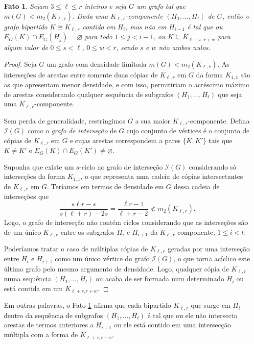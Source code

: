 \documentclass[12pt,a4paper]{book}
\newcommand{\K}{K_{\ell,r}} %
\newtheorem{fato}      [teorema] {Fato}
\begin{document}
      \begin{fato}\label{fato:ciclos}
        Sejam $3\leq \ell \leq r$ inteiros e seja $G$ um grafo tal que $m(G) < m_2(\K)$.  
        Dada uma $\K$-componente $(H_1, \ldots, H_t)$ de $G$, 
        então o grafo bipartido $K \cong \K$ contido em $H_i$, mas não em $H_{i-1}$ é tal que ou $E_G(K) \cap E_G(H_j) = \varnothing$
        para todo $1 \leq j < i-1$, ou  $K \subseteq K_{\ell+s, r+w}$
        para algum valor de $0\leq s < \ell$, $0\leq w < r$, sendo $s$ e $w$ não ambos nulos. 
  \end{fato}
\begin{proof}
        Seja $G$ um grafo com densidade limitada $m(G) < m_2(\K)$. 
        As interseções de arestas entre somente duas cópias de $\K$ em $G$ da forma $K_{1,1}$ são as que apresentam menor densidade, e com isso, permitiriam o acréscimo máximo de arestas considerando qualquer sequência de subgrafos $(H_1, \ldots, H_t)$ que seja uma $\K$-componente. 
        
        Sem perda de generalidade, restringimos $G$ a sua maior $\K$-componente.       
        Defina $\mathcal{I}(G)$ como o \emph{grafo de interseção} de $G$ cujo conjunto de vértices é o conjunto de cópias de $\K$ em $G$ e cujas arestas correspondem a pares $\{K, K'\}$ tais que $K \neq K'$ e $E_G(K) \cap E_G(K') \neq \varnothing$.
         
        Suponha que existe um $s$-ciclo no grafo de interseção $\mathcal{I}(G)$ considerando só interseções da forma $K_{1,1}$, o que representa uma cadeia de cópias intersectantes de $\K$ em $G$.
        Teríamos em termos de densidade em $G$ dessa cadeia de interseções que
        \[
            \frac{s\ell r - s}{s(\ell+r) - 2s} =  \frac{\ell r - 1}{\ell+r - 2}
            \not < m_2(\K). 
        \]
        Logo, o grafo de interseção não contém ciclos considerando que as interseções são de um único $\K$ entre os subgrafos $H_i$ e $H_{i+1}$ da $\K$-componente, $1 \leq i < t$.
        
       Poderíamos tratar o caso de múltiplas cópias de $\K$ geradas por uma interseção entre $H_i$ e $H_{i+1}$ como um único vértice do grafo $\mathcal{I}(G)$, o que torna acíclico este último grafo pelo mesmo argumento de densidade. 
       Logo, qualquer cópia de $\K$  numa sequência $(H_1, \ldots, H_t)$ ou acaba de ser formada num determinado $H_i$ ou está contida em um $K_{\ell+s, r+w}$.
\end{proof}

Em outras palavras, o Fato \ref{fato:ciclos} afirma que cada bipartido $\K$ que surge em $H_i$ dentro da sequência de subgrafos $(H_1, \ldots, H_t)$ é tal que ou ele não intersecta arestas de termos anteriores a $H_{i-1}$ ou ele está contido em uma intersecção múltipla com a forma de $K_{\ell+s, r+w}$. 
\end{document}

